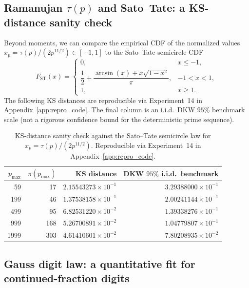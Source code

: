 \subsection{Ramanujan \texorpdfstring{$\tau(p)$}{tau(p)} and Sato--Tate: a KS-distance sanity check}
\label{app:quant_fits_sato_tate_ks}

Beyond moments, we can compare the empirical CDF of the normalized values $x_p=\tau(p)/(2p^{11/2})\in[-1,1]$ to the Sato--Tate semicircle CDF
\begin{equation}
F_{\mathrm{ST}}(x)=
\begin{cases}
0, & x\le -1,\\
\dfrac{1}{2}+\dfrac{\arcsin(x)+x\sqrt{1-x^2}}{\pi}, & -1<x<1,\\
1, & x\ge 1.
\end{cases}
\end{equation}
The following KS distances are reproducible via Experiment~14 in Appendix~\ref{app:repro_code}. The final column is an i.i.d.\ DKW $95\%$ benchmark scale (not a rigorous confidence bound for the deterministic prime sequence).

\begin{table}[H]
\centering
\begin{tabular}{rrrr}
\toprule
$p_{\max}$ & $\pi(p_{\max})$ & KS distance & DKW $95\%$ i.i.d.\ benchmark \\
\midrule
59   & 17  & $2.15543273\times 10^{-1}$ & $3.29388000\times 10^{-1}$ \\
199  & 46  & $1.37538158\times 10^{-1}$ & $2.00241144\times 10^{-1}$ \\
499  & 95  & $6.82531220\times 10^{-2}$ & $1.39338276\times 10^{-1}$ \\
999  & 168 & $5.26700891\times 10^{-2}$ & $1.04779807\times 10^{-1}$ \\
1999 & 303 & $4.61410601\times 10^{-2}$ & $7.80208935\times 10^{-2}$ \\
\bottomrule
\end{tabular}
\caption{KS-distance sanity check against the Sato--Tate semicircle law for $x_p=\tau(p)/(2p^{11/2})$. Reproducible via Experiment~14 in Appendix~\ref{app:repro_code}.}
\label{tab:tau_sato_tate_ks}
\end{table}

\subsection{Gauss digit law: a quantitative fit for continued-fraction digits}
\label{app:quant_fits_gauss_digits}

